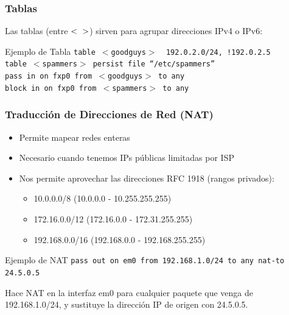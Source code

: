 \documentclass{beamer}
\begin{document}

\begin{frame}
\frametitle{Tablas}

Las tablas (entre $< \hspace{2mm} >$) sirven para agrupar direcciones IPv4 o IPv6:

\begin{block}{Ejemplo de Tabla}
\tt table $<$goodguys$>$ { 192.0.2.0/24, !192.0.2.5 } \\
table $<$spammers$>$ persist file ``/etc/spammers'' \\
pass  in on fxp0 from \alert{$<$goodguys$>$} to any \\
block in on fxp0 from \alert{$<$spammers$>$} to any
\end{block}

\end{frame}


\begin{frame}
\frametitle{Traducción de Direcciones de Red (NAT)}

\begin{itemize}
\item Permite mapear redes enteras
\item Necesario cuando tenemos IPs públicas limitadas por ISP
\item Nos permite aprovechar las direcciones RFC 1918 (rangos privados):
	\begin{itemize}
	\item	10.0.0.0/8   \hspace{4mm}    (10.0.0.0 - 10.255.255.255)
	\item	172.16.0.0/12   \hspace{4mm} (172.16.0.0 - 172.31.255.255)
	\item	192.168.0.0/16 \hspace{4mm}  (192.168.0.0 - 192.168.255.255)
	\end{itemize}
\end{itemize}

\begin{block}{Ejemplo de NAT}
\tt pass out on em0 from 192.168.1.0/24 to any nat-to 24.5.0.5
\end{block}

\footnotesize
Hace NAT en la interfaz em0 para cualquier paquete que venga de 192.168.1.0/24, y sustituye la dirección IP de origen con 24.5.0.5.

\end{frame}
\end{document}
